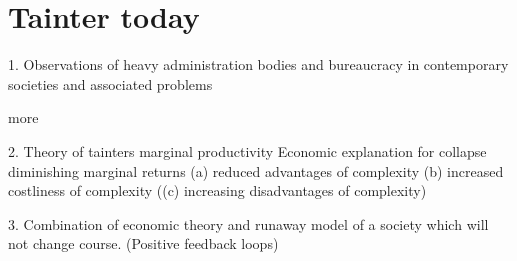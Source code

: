 
\section{Tainter today}

%
%
%

1. Observations of heavy administration bodies and bureaucracy in contemporary societies and associated problems

more


2. Theory of tainters marginal productivity
Economic explanation for collapse
diminishing marginal returns
(a) reduced advantages of complexity
(b) increased costliness of complexity
((c) increasing disadvantages of complexity)



3. Combination of economic theory and runaway model of a society which will not change course. (Positive feedback loops)
